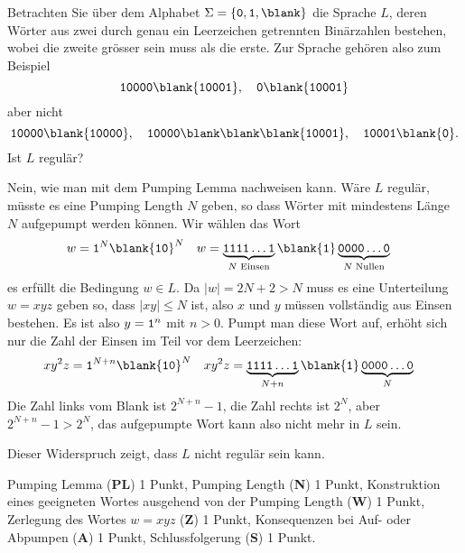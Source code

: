 Betrachten Sie über dem Alphabet $\Sigma = \{{\tt 0},{\tt 1},\blank\}$ die
Sprache $L$, deren Wörter aus zwei durch genau ein Leerzeichen getrennten
Binärzahlen bestehen, wobei die zweite grösser sein muss als die erste.
Zur Sprache gehören also zum Beispiel
\[
{\tt 10000}\blank{\tt 10001},\quad
{\tt 0}\blank{\tt 10001}
\]
aber nicht
\[
{\tt 10000}\blank{\tt 10000},\quad
{\tt 10000}\blank\blank\blank{\tt 10001},\quad
{\tt 10001}\blank{\tt 0}.
\]
Ist $L$ regulär?


\begin{loesung}
Nein, wie man mit dem Pumping Lemma nachweisen kann.
Wäre $L$ regulär, müsste es eine Pumping Length $N$ geben, so dass
Wörter mit mindestens Länge $N$ aufgepumpt werden können. Wir wählen
das Wort
\begin{align*}
w&= {\tt 1}^N\blank{\tt 10}^N
&
w&=\underbrace{\tt 1111\dots 1}_{\text{$N$ Einsen}}\blank{\tt 1}\underbrace{\tt 0000\dots 0}_{\text{$N$ Nullen}}
\end{align*}
es erfüllt die Bedingung $w\in L$. Da $|w| = 2N+2>N$ muss es eine
Unterteilung $w=xyz$ geben so, dass $|xy|\le N$ ist, also $x$ und $y$
müssen vollständig aus Einsen bestehen. Es ist also $y={\tt 1}^n$
mit $n > 0$.
Pumpt man diese Wort auf, erhöht sich nur die Zahl der Einsen im Teil
vor dem Leerzeichen:
\begin{align*}
xy^2z&={\tt 1}^{N+n}\blank{\tt 10}^N
&
xy^2z&=
\underbrace{\tt 1111\dots 1}_{N+n}\blank{\tt 1}\underbrace{\tt 0000\dots 0}_{N}
\end{align*}
Die Zahl links vom Blank ist $2^{N+n}-1$, die Zahl rechts ist $2^N$,
aber $2^{N+n}-1 > 2^N$, das aufgepumpte Wort kann also nicht mehr
in $L$ sein.

Dieser Widerspruch zeigt, dass $L$ nicht regulär sein kann.
\end{loesung}

\begin{bewertung}
Pumping Lemma ({\bf PL}) 1 Punkt,
Pumping Length ({\bf N}) 1 Punkt,
Konstruktion eines geeigneten Wortes ausgehend von der Pumping Length
({\bf W}) 1 Punkt,
Zerlegung des Wortes $w=xyz$ ({\bf Z}) 1 Punkt,
Konsequenzen bei Auf- oder Abpumpen ({\bf A}) 1 Punkt,
Schlussfolgerung ({\bf S}) 1 Punkt.
\end{bewertung}

